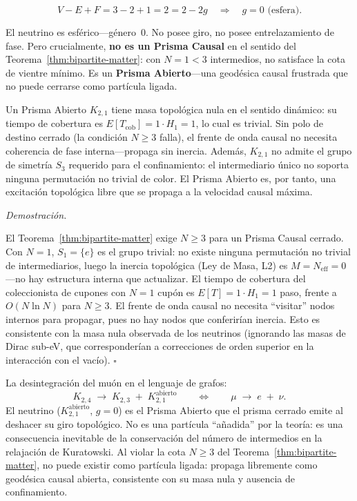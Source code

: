 \documentclass[11pt, a4paper, openany]{book}
\renewenvironment{proof}[1][Demostraci\'on]{%
  \par\noindent\textit{#1.}\quad
}{\hfill$\square$\par\medskip}
\begin{document}
\[
  V - E + F = 3 - 2 + 1 = 2 = 2 - 2g
  \quad\Longrightarrow\quad g = 0 \text{ (esfera).}
\]

El neutrino es esf\'erico---g\'enero~0. No posee giro, no
posee entrelazamiento de fase. Pero crucialmente, \textbf{no es un
Prisma Causal} en el sentido del Teorema~\ref{thm:bipartite-matter}:
con $N = 1 < 3$ intermedios, no satisface la cota de vientre
m\'inimo. Es un \textbf{Prisma Abierto}---una geod\'esica causal
frustrada que no puede cerrarse como part\'icula ligada.

\begin{theorem}
\label{thm:neutrino-massless}
Un Prisma Abierto $K_{2,1}$ tiene masa topol\'ogica nula en el
sentido din\'amico: su tiempo de cobertura es $E[T_{\mathrm{cob}}]
= 1 \cdot H_1 = 1$, lo cual es trivial. Sin polo de destino
cerrado (la condici\'on $N \geq 3$ falla), el frente de onda causal
no necesita coherencia de fase interna---propaga sin inercia. Adem\'as,
$K_{2,1}$ no admite el grupo de simetr\'ia $S_3$ requerido para el
confinamiento: el intermediario \'unico no soporta ninguna
permutaci\'on no trivial de color. El Prisma Abierto es, por tanto,
una excitaci\'on topol\'ogica libre que se propaga a la velocidad
causal m\'axima.
\end{theorem}

\begin{proof}
El Teorema~\ref{thm:bipartite-matter} exige $N \geq 3$ para un Prisma
Causal cerrado. Con $N = 1$, $S_1 = \{e\}$ es el grupo trivial:
no existe ninguna permutaci\'on no trivial de intermediarios, luego
la inercia topol\'ogica (Ley de Masa, L2) es $M = N_{\mathrm{eff}}
= 0$---no hay estructura interna que actualizar. El tiempo de cobertura
del coleccionista de cupones con $N = 1$ cup\'on es $E[T] = 1 \cdot
H_1 = 1$ paso, frente a $O(N \ln N)$ para $N \geq 3$. El frente
de onda causal no necesita ``visitar'' nodos internos para propagar,
pues no hay nodos que conferir\'ian inercia. Esto es consistente con
la masa nula observada de los neutrinos
(ignorando las masas de Dirac sub-eV, que corresponder\'ian a
correcciones de orden superior en la interacci\'on con el vac\'io).
\end{proof}

\begin{result}[title={El neutrino es la cicatriz topol\'ogica}]
La desintegraci\'on del mu\'on en el lenguaje de grafos:
\[
  K_{2,4} \;\longrightarrow\; K_{2,3} \;+\; K_{2,1}^{\mathrm{abierto}}
  \qquad\Longleftrightarrow\qquad
  \mu \;\longrightarrow\; e \;+\; \nu.
\]
El neutrino ($K_{2,1}^{\mathrm{abierto}}$, $g = 0$) es el Prisma
Abierto que el prisma cerrado emite al deshacer su giro topol\'ogico.
No es una part\'icula ``a\~nadida'' por la teor\'ia: es una
consecuencia inevitable de la conservaci\'on del n\'umero de intermedios
en la relajaci\'on de Kuratowski. Al violar la cota $N \geq 3$ del
Teorema~\ref{thm:bipartite-matter}, no puede existir como part\'icula
ligada: propaga libremente como geod\'esica causal abierta, consistente
con su masa nula y ausencia de confinamiento.
\end{result}
\end{document}
